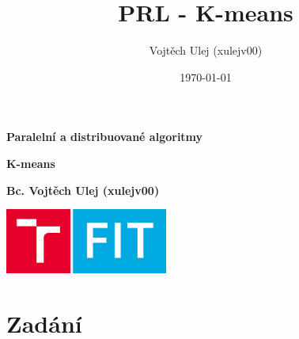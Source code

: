 \documentclass{report}
\author{Vojtěch Ulej (xulejv00)}
\title{PRL - K-means}
\date{\today}
\begin{document}
    \thispagestyle{empty}
    \begin{center}
        \vspace*{1cm}
    
        \Huge
        \textbf{Paralelní a distribuované algoritmy}
    
        \vspace{0.5cm}
        \LARGE
        \textbf{K-means}
    
        \vspace{1.5cm}
    
        \textbf{Bc. Vojtěch Ulej (xulejv00)}
    
        \vfill
    
        \vspace{0.8cm}
    
        \includegraphics[width=0.4\textwidth]{pictures/fit.png}
    
        \Large
    
    \end{center}
    \newpage
    \chapter{Zadání}
    
    
\end{document}
